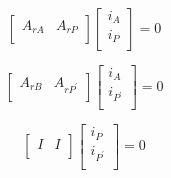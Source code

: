 \documentclass[10pt,psfig,letterpaper,twocolumn]{article}
\begin{document}
\begin{figure}[!ht]
{\centering {} \par}
\caption{}
\label{multi}
\end{figure}

\begin{equation}
\left[\begin{array}{ll}
A_{rA} & A_{rP}\\
\end{array}\right]
\left[\begin{array}{l}
i_{A} \\
i_{P}\\
\end{array}\right]
= 0
\end{equation}

\begin{equation}
\left[\begin{array}{ll}
A_{rB} & A_{rP^{'}}\\
\end{array}\right]
\left[\begin{array}{l}
i_{A} \\
i_{P^{'}}\\
\end{array}\right]
= 0
\end{equation}

\begin{equation}
\left[\begin{array}{ll}
I & I\\
\end{array}\right]
\left[\begin{array}{l}
i_{P} \\
i_{P^{'}}\\
\end{array}\right]
= 0
\end{equation}
\end{document}
